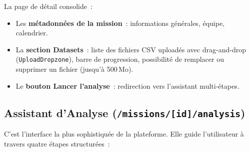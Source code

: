 La page de détail consolide~:

\begin{itemize}[leftmargin=1.5em]
  \item Les \textbf{métadonnées de la mission}~: informations générales, équipe, calendrier.
  \item La \textbf{section Datasets}~: liste des fichiers CSV uploadés avec drag-and-drop (\texttt{UploadDropzone}), barre de progression, possibilité de remplacer ou supprimer un fichier (jusqu'à 500\,Mo).
  \item Le \textbf{bouton Lancer l'analyse}~: redirection vers l'assistant multi-étapes.
\end{itemize}

\subsection{Assistant d'Analyse (\texttt{/missions/[id]/analysis})}

C'est l'interface la plus sophistiquée de la plateforme. Elle guide l'utilisateur à travers quatre étapes structurées~:

